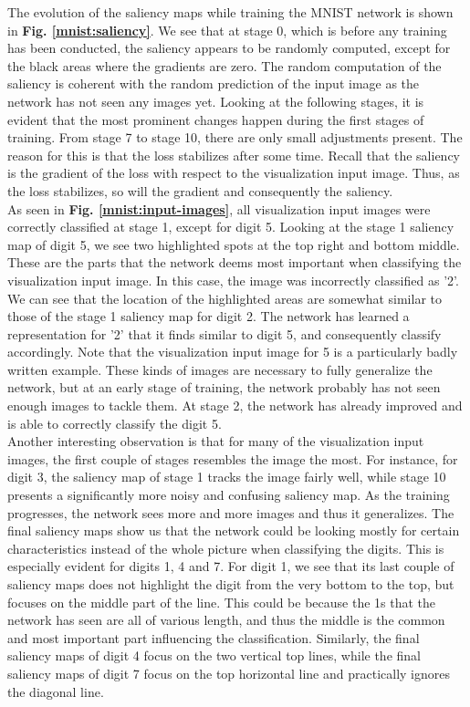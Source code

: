 The evolution of the saliency maps while training the MNIST network is shown in \textbf{Fig. \ref{mnist:saliency}}. We see that at stage 0, which is before any training has been conducted, the saliency appears to be randomly computed, except for the black areas where the gradients are zero. The random computation of the saliency is coherent with the random prediction of the input image as the network has not seen any images yet. Looking at the following stages, it is evident that the most prominent changes happen during the first stages of training. From stage 7 to stage 10, there are only small adjustments present. The reason for this is that the loss stabilizes after some time. Recall that the saliency is the gradient of the loss with respect to the visualization input image. Thus, as the loss stabilizes, so will the gradient and consequently the saliency. \\

\noindent As seen in \textbf{Fig. \ref{mnist:input-images}}, all visualization input images were correctly classified at stage 1, except for digit 5. Looking at the stage 1 saliency map of digit 5, we see two highlighted spots at the top right and bottom middle. These are the parts that the network deems most important when classifying the visualization input image. In this case, the image was incorrectly classified as '2'. We can see that the location of the highlighted areas are somewhat similar to those of the stage 1 saliency map for digit 2. The network has learned a representation for '2' that it finds similar to digit 5, and consequently classify accordingly. Note that the visualization input image for 5 is a particularly badly written example. These kinds of images are necessary to fully generalize the network, but at an early stage of training, the network probably has not seen enough images to tackle them. At stage 2, the network has already improved and is able to correctly classify the digit 5. \\

\noindent Another interesting observation is that for many of the visualization input images, the first couple of stages resembles the image the most. For instance, for digit 3, the saliency map of stage 1 tracks the image fairly well, while stage 10 presents a significantly more noisy and confusing saliency map. As the training progresses, the network sees more and more images and thus it generalizes. The final saliency maps show us that the network could be looking mostly for certain characteristics instead of the whole picture when classifying the digits. This is especially evident for digits 1, 4 and 7. For digit 1, we see that its last couple of saliency maps does not highlight the digit from the very bottom to the top, but focuses on the middle part of the line. This could be because the 1s that the network has seen are all of various length, and thus the middle is the common and most important part influencing the classification. Similarly, the final saliency maps of digit 4 focus on the two vertical top lines, while the final saliency maps of digit 7 focus on the top horizontal line and practically ignores the diagonal line. \\


